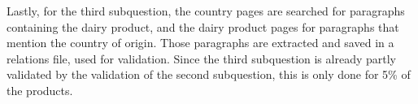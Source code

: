 \documentclass[sigconf]{acmart-txmm}
\begin{document}
Lastly, for the third subquestion, the country pages are searched for paragraphs containing the dairy product, and the dairy product pages for paragraphs that mention the country of origin.
Those paragraphs are extracted and saved in a relations file, used for validation.
Since the third subquestion is already partly validated by the validation of the second subquestion, this is only done for 5\% of the products.






\end{document}
